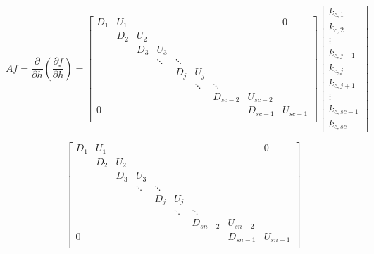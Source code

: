 \documentclass[11pt]{article}
\begin{document}
\[
Af = 
\frac{\partial}{\partial h} \left( \frac{\partial f}{\partial h} \right)
=
\left[
\begin{array}{ccccccccc}
D_{1} & U_{1} &  &   &   &   &   &   & 0 \\
  & D_{2} & U_{2} &   &   &   &   &   &   \\
  &   & D_{3} & U_{3} &   &   &   &   &   \\
  &   &  & \ddots & \ddots &   &   &   &   \\
  &   &   &   & D_{j} & U_{j} &   &   &   \\
  &   &   &   &  & \ddots & \ddots &   &   \\
  &   &   &   &   &   & D_{sc-2} & U_{sc-2} &   \\
 0 &   &   &   &   &   &   & D_{sc-1} & U_{sc-1} \\
\end{array}
\right]
\left[ \begin{array}{c}
k_{c,1} \\ k_{c,2} \\ \vdots \\ k_{c,j-1} \\ k_{c,j} \\ k_{c,j+1} \\ \vdots \\ k_{c,sc-1} \\ k_{c,sc}
\end{array} \right]
\]

\[
\left[
\begin{array}{ccccccccc}
D_{1} & U_{1} &  &   &   &   &   &   & 0 \\
  & D_{2} & U_{2} &   &   &   &   &   &   \\
  &   & D_{3} & U_{3} &   &   &   &   &   \\
  &   &  & \ddots & \ddots &   &   &   &   \\
  &   &   &   & D_{j} & U_{j} &   &   &   \\
  &   &   &   &  & \ddots & \ddots &   &   \\
  &   &   &   &   &   & D_{sn-2} & U_{sn-2} &   \\
 0 &   &   &   &   &   &   & D_{sn-1} & U_{sn-1} \\
\end{array}
\right]
\]
\end{document}
